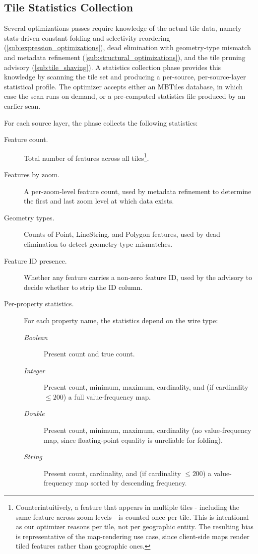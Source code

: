 \subsection{Tile Statistics Collection}\label{sub:tile_statistics}

Several optimizations passes require knowledge of the actual tile data, namely stats-driven constant folding and selectivity reordering (\cref{sub:expression_optimizations}), dead elimination with geometry-type mismatch and metadata refinement (\cref{sub:structural_optimizations}), and the tile pruning advisory (\cref{sub:tile_shaving}).
A statistics collection phase provides this knowledge by scanning the tile set and producing a per-source, per-source-layer statistical profile.
The optimizer accepts either an MBTiles database, in which case the scan runs on demand, or a pre-computed statistics file produced by an earlier scan.

For each source layer, the phase collects the following statistics:

\begin{description}
    \item[Feature count.] Total number of features across all tiles\footnote{
    Counterintuitively, a feature that appears in multiple tiles - including the same feature across zoom levels - is counted once per tile.
    This is intentional as our optimizer reasons per tile, not per geographic entity.
    The resulting bias is representative of the map-rendering use case, since client-side maps render tiled features rather than geographic ones.}.
    \item[Features by zoom.] A per-zoom-level feature count, used by metadata refinement to determine the first and last zoom level at which data exists.
    \item[Geometry types.] Counts of Point, LineString, and Polygon features, used by dead elimination to detect geometry-type mismatches.
    \item[Feature ID presence.] Whether any feature carries a non-zero feature ID, used by the advisory to decide whether to strip the ID column.
    \item[Per-property statistics.] For each property name, the statistics depend on the wire type:
    \begin{description}
        \item[\emph{Boolean}] Present count and true count.
        \item[\emph{Integer}] Present count, minimum, maximum, cardinality, and (if cardinality $\leq 200$) a full value-frequency map.
        \item[\emph{Double}] Present count, minimum, maximum, cardinality (no value-frequency map, since floating-point equality is unreliable for folding).
        \item[\emph{String}] Present count, cardinality, and (if cardinality $\leq 200$) a value-frequency map sorted by descending frequency.
    \end{description}
\end{description}


